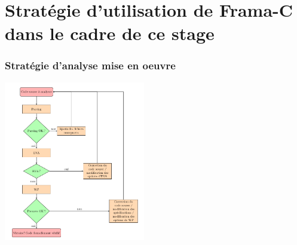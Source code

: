 \documentclass[french]{beamer}
\begin{document}
\section[Utilisation de Frama-C]{Stratégie d'utilisation de Frama-C dans le cadre de ce stage}

\begin{frame}
\frametitle{Stratégie d'analyse mise en oeuvre}


\begin{center}
 \includegraphics[height=7cm]{images/strategie_analyse.png}
\end{center}

\end{frame}
\end{document}
